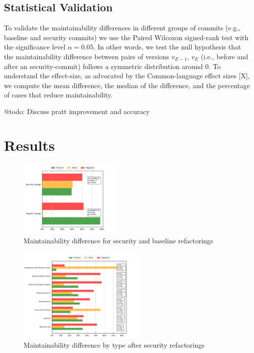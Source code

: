 \documentclass[10pt,conference]{IEEEtran}
\begin{document}
\subsection{Statistical Validation}\label{sec:statsval}

To validate the maintainability differences in different groups of commits (e.g., baseline and security commits) we use the Paired Wilcoxon signed-rank test with the significance level $\alpha = 0.05$. In other words, we test the null hypothesis that the maintainability difference between pairs of versions $v_{E-1}$, $v_E$ (i.e., before and after an security-commit) follows a symmetric distribution around 0. To understand the effect-size, as advocated by the Common-language effect sizes [X], we compute the mean difference, the median of the difference, and the percentage of cases that reduce maintainability.

\textcolor{mypink3}{@todo: Discuss pratt improvement and accuracy}

\section{Results}


\begin{figure}[h]
 	\centering
 	\includegraphics[width=0.45\textwidth]{figures/maintainability.pdf}
 	\caption{Maintainability difference for security and baseline refactorings}
	\label{fig:secvsreg}
\end{figure}

\begin{figure}[h]
 	\centering
 	\includegraphics[width=0.55\textwidth]{figures/category.pdf}
 	\caption{Maintainability difference by type after security refactorings}
	\label{fig:pat}
\end{figure}
\end{document}
